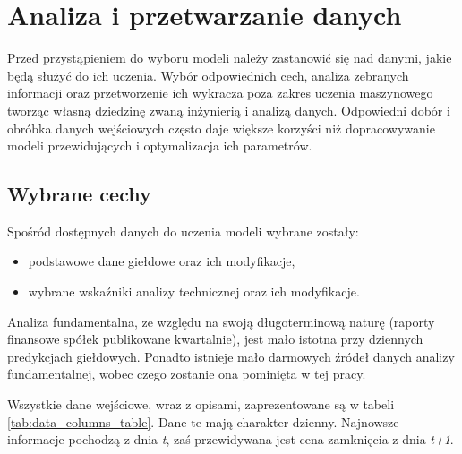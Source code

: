 \documentclass[a4paper, twoside, 11pt, openright]{article}
\begin{document}
\bigskip

\newpage

\section{Analiza i przetwarzanie danych}

Przed przystąpieniem do wyboru modeli należy zastanowić się nad danymi, jakie będą służyć do ich uczenia. Wybór odpowiednich cech, analiza zebranych informacji oraz przetworzenie ich wykracza poza zakres uczenia maszynowego tworząc własną dziedzinę zwaną inżynierią i analizą danych. Odpowiedni dobór i obróbka danych wejściowych często daje większe korzyści niż dopracowywanie modeli przewidujących i optymalizacja ich parametrów. 

\subsection{Wybrane cechy}

Spośród dostępnych danych do uczenia modeli wybrane zostały: 
\begin{itemize}
\item podstawowe dane giełdowe oraz ich modyfikacje,
\item wybrane wskaźniki analizy technicznej oraz ich modyfikacje.
\end{itemize}

Analiza fundamentalna, ze względu na swoją długoterminową naturę (raporty finansowe spółek publikowane kwartalnie), jest mało istotna przy dziennych predykcjach giełdowych. Ponadto istnieje mało darmowych źródeł danych analizy fundamentalnej, wobec czego zostanie ona pominięta w tej pracy.

\bigskip

Wszystkie dane wejściowe, wraz z opisami, zaprezentowane są w tabeli \ref{tab:data_columns_table}. Dane te mają charakter dzienny. Najnowsze informacje pochodzą z dnia \textit{t}, zaś przewidywana jest cena zamknięcia z dnia \textit{t+1}.
\end{document}
